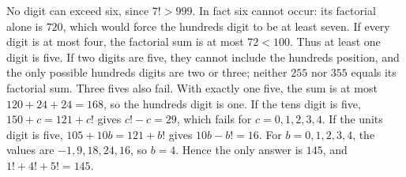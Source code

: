 No digit can exceed six, since $7!>999$. In fact six cannot occur: its factorial alone is $720$, which would force the hundreds digit to be at least seven. If every digit is at most four, the factorial sum is at most $72<100$. Thus at least one digit is five.
If two digits are five, they cannot include the hundreds position, and the only possible hundreds digits are two or three; neither $255$ nor $355$ equals its factorial sum. Three fives also fail. With exactly one five, the sum is at most $120+24+24=168$, so the hundreds digit is one. If the tens digit is five, $150+c=121+c!$ gives $c!-c=29$, which fails for $c=0,1,2,3,4$. If the units digit is five, $105+10b=121+b!$ gives $10b-b!=16$. For $b=0,1,2,3,4$, the values are $-1,9,18,24,16$, so $b=4$. Hence the only answer is $\boxed{145}$, and $1!+4!+5!=145$.
